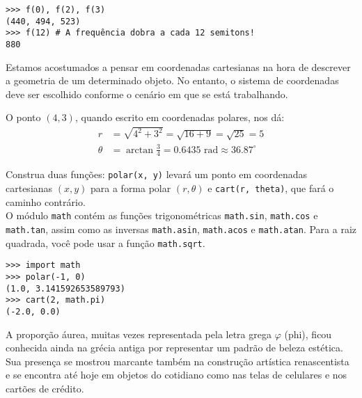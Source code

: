 \documentclass[12pt]{article}
\begin{document}
	\example 
	\begin{lstlisting}
>>> f(0), f(2), f(3)
(440, 494, 523)
>>> f(12) # A frequência dobra a cada 12 semitons!
880
	\end{lstlisting}
	
	\vfill
	
	\pagebreak
	
	
	Estamos acostumados a pensar em coordenadas cartesianas na hora de descrever a geometria de um determinado objeto. No entanto, o sistema de coordenadas deve ser escolhido conforme o cenário em que se está trabalhando.
	
	
	
	O ponto $(4, 3)$, quando escrito em coordenadas polares, nos dá:
	\begin{align*}
	r &= \sqrt{4^2 + 3^2} = \sqrt{16 + 9} = \sqrt{25} = 5\\
	\theta &= \arctan\frac{3}{4} = 0.6435 \text{ rad} \approx 36.87^{\circ}
	\end{align*}
	
	\quest{} Construa duas funções: \texttt{polar(x, y)} levará um ponto em coordenadas cartesianas $(x, y)$ para a forma polar $(r, \theta)$ e \texttt{cart(r, theta)}, que fará o caminho contrário.\\
	
	\clue{} O módulo \texttt{math} contém as funções trigonométricas \texttt{math.sin}, \texttt{math.cos} e \texttt{math.tan}, assim como as inversas \texttt{math.asin}, \texttt{math.acos} e \texttt{math.atan}. Para a raiz quadrada, você pode usar a função \texttt{math.sqrt}.\\
	
	\example
	\begin{lstlisting}
>>> import math
>>> polar(-1, 0)
(1.0, 3.141592653589793)
>>> cart(2, math.pi)
(-2.0, 0.0)
	\end{lstlisting}
	
	\pagebreak
	

	A proporção áurea, muitas vezes representada pela letra grega $\varphi$ (phi), ficou conhecida ainda na grécia antiga por representar um padrão de beleza estética. Sua presença se mostrou marcante também na construção artística renascentista e se encontra até hoje em objetos do cotidiano como nas telas de celulares e nos cartões de crédito.
	
	
	
\end{document}
